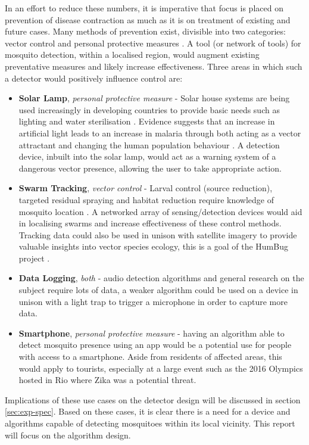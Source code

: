         In an effort to reduce these numbers, it is imperative that focus is placed on prevention of disease contraction as much as it is on treatment of existing and future cases. Many methods of prevention exist, divisible into two categories: vector control and personal protective measures \cite{Caraballo2014}. A tool (or network of tools) for mosquito detection, within a localised region, would augment existing preventative measures and likely increase effectiveness. Three areas in which such a detector would positively influence control are:
        \begin{itemize}
            \item{\textbf{Solar Lamp}, \textit{personal protective measure} - Solar house systems are being used increasingly in developing countries to provide basic needs such as lighting and water sterilisation \cite{Akikur2013}. Evidence suggests that an increase in artificial light leads to an increase in malaria through both acting as a vector attractant and changing the human population behaviour \cite{Barghini2010}. A detection device, inbuilt into the solar lamp, would act as a warning system of a dangerous vector presence, allowing the user to take appropriate action.}
            \item{\textbf{Swarm Tracking}, \textit{vector control} - Larval control (source reduction), targeted residual spraying and habitat reduction require knowledge of mosquito location \cite{Caraballo2014,Pates2005,WHOVectorControl2016}. A networked array of sensing/detection devices would aid in localising swarms and increase effectiveness of these control methods. Tracking data could also be used in unison with satellite imagery to provide valuable insights into vector species ecology, this is a goal of the HumBug project \cite{HumBug2016}.}
            \item{\textbf{Data Logging}, \textit{both} - audio detection algorithms and general research on the subject require lots of data, a weaker algorithm could be used on a device in unison with a light trap to trigger a microphone in order to capture more data.}
            \item{\textbf{Smartphone}, \textit{personal protective measure} - having an algorithm able to detect mosquito presence using an app would be a potential use for people with access to a smartphone. Aside from residents of affected areas, this would apply to tourists, especially at a large event such as the 2016 Olympics hosted in Rio where Zika was a potential threat.}
        \end{itemize}
        Implications of these use cases on the detector design will be discussed in section \ref{sec:exp-spec}. Based on these cases, it is clear there is a need for a device and algorithms capable of detecting mosquitoes within its local vicinity. This report will focus on the algorithm design.
        
